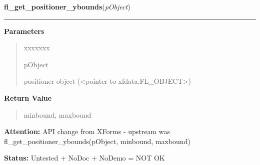 \hspace{.8\funcindent}\begin{boxedminipage}{\funcwidth}

    \raggedright \textbf{fl\_get\_positioner\_ybounds}(\textit{pObject})

    \vspace{-1.5ex}

    \rule{\textwidth}{0.5\fboxrule}
\setlength{\parskip}{2ex}
\setlength{\parskip}{1ex}
      \textbf{Parameters}
      \vspace{-1ex}

      \begin{quote}
        \begin{Ventry}{xxxxxxx}

          \item[pObject]

          positioner object ({\textless}pointer to 
          xfdata.FL\_OBJECT{\textgreater})

        \end{Ventry}

      \end{quote}

      \textbf{Return Value}
    \vspace{-1ex}

      \begin{quote}
      minbound, maxbound

      \end{quote}

\textbf{Attention:} API change from XForms - upstream was fl\_get\_positioner\_ybounds(pObject,
minbound, maxbound)



\textbf{Status:} Untested + NoDoc + NoDemo = NOT OK



    \end{boxedminipage}

    \label{xformslib:library:fl_set_positioner_xstep}

    \vspace{0.5ex}

